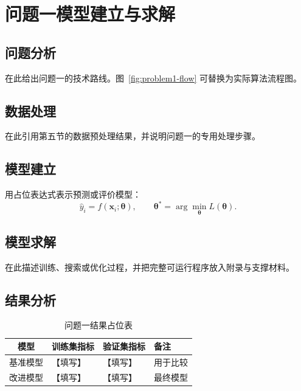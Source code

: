 \section{问题一模型建立与求解}

\subsection{问题分析}
在此给出问题一的技术路线。图~\ref{fig:problem1-flow} 可替换为实际算法流程图。

\subsection{数据处理}
在此引用第五节的数据预处理结果，并说明问题一的专用处理步骤。

\subsection{模型建立}
用占位表达式表示预测或评价模型：
\begin{equation}
  \hat{y}_i=f(\boldsymbol{x}_i;\boldsymbol{\theta}),
  \qquad
  \boldsymbol{\theta}^{*}=\arg\min_{\boldsymbol{\theta}}L(\boldsymbol{\theta}).
  \label{eq:model-placeholder}
\end{equation}

\subsection{模型求解}
在此描述训练、搜索或优化过程，并把完整可运行程序放入附录与支撑材料。

\subsection{结果分析}
\begin{table}[H]
  \centering
  \caption{问题一结果占位表}
  \label{tab:problem1-result}
  \begin{tabularx}{0.78\textwidth}{cXXX}
    \toprule
    模型 & 训练集指标 & 验证集指标 & 备注 \\
    \midrule
    基准模型 & 【填写】 & 【填写】 & 用于比较 \\
    改进模型 & 【填写】 & 【填写】 & 最终模型 \\
    \bottomrule
  \end{tabularx}
\end{table}
